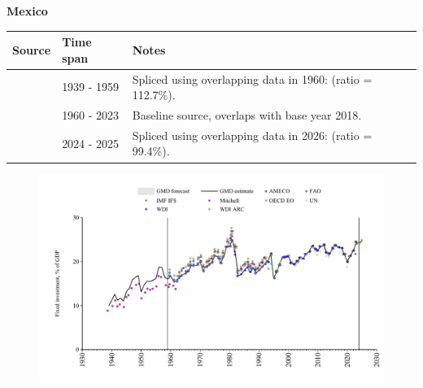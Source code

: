 \documentclass[12pt,a4paper,landscape]{article}
\begin{document}
\begin{adjustbox}{max totalsize={\paperwidth}{\paperheight},center}
\begin{minipage}[t][\textheight][t]{\textwidth}
\vspace*{0.5cm}
{}
\begin{center}
{\Large\bfseries Mexico}
\end{center}
\vspace{0.5cm}
\begin{table}[H]
\centering
\small
\begin{tabular}{|l|l|l|}
\hline
\textbf{Source} & \textbf{Time span} & \textbf{Notes} \\
\hline
\rowcolor{white}\cite{Mitchell}& 1939 - 1959 &Spliced using overlapping data in 1960: (ratio = 112.7\%).\\
\rowcolor{lightgray}\cite{WDI}& 1960 - 2023 &Baseline source, overlaps with base year 2018.\\
\rowcolor{white}\cite{OECD_EO}& 2024 - 2025 &Spliced using overlapping data in 2026: (ratio = 99.4\%).\\
\hline
\end{tabular}
\end{table}
\begin{figure}[H]
\centering
\includegraphics[width=\textwidth,height=0.6\textheight,keepaspectratio]{graphs/MEX_finv_GDP.pdf}
\end{figure}
\end{minipage}
\end{adjustbox}
\end{document}
